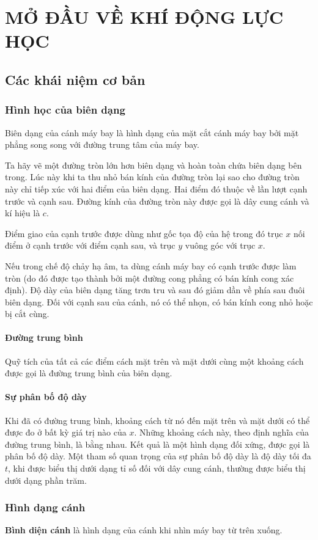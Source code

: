 \documentclass[KHI_DONG_HOC.tex]{subfiles}
\begin{document}
\chapter{MỞ ĐẦU VỀ KHÍ ĐỘNG LỰC HỌC}

\section{Các khái niệm cơ bản}
\subsection{Hình học của biên dạng}
Biên dạng của cánh máy bay là hình dạng của mặt cắt cánh máy bay bởi mặt phẳng song song với đường trung tâm của máy bay.

Ta hãy vẽ một đường tròn lớn hơn biên dạng và hoàn toàn chứa biên dạng bên trong. Lúc này khi ta thu nhỏ bán kính của đường tròn lại sao cho đường tròn này chỉ tiếp xúc với hai điểm của biên dạng. Hai điểm đó thuộc về lần lượt cạnh trước và cạnh sau. Đường kính của đường tròn này được gọi là dây cung cánh và kí hiệu là $c$.

Điểm giao của cạnh trước được dùng như gốc tọa độ của hệ trong đó trục $x$ nối điểm ở cạnh trước với điểm cạnh sau, và trục $y$ vuông góc với trục $x$.

Nếu trong chế độ chảy hạ âm, ta dùng cánh máy bay có cạnh trước được làm tròn (do đó được tạo thành bởi một đường cong phẳng có bán kính cong xác định). Độ dày của biên dạng tăng trơn tru và sau đó giảm dần về phía sau đuôi biên dạng. Đối với cạnh sau của cánh, nó có thể nhọn, có bán kính cong nhỏ hoặc bị cắt cùng.
\subsubsection{Đường trung bình}
Quỹ tích của tất cả các điểm cách mặt trên và mặt dưới cùng một khoảng cách được gọi là đường trung bình của biên dạng.
\subsubsection{Sự phân bố độ dày}
Khi đã có đường trung bình, khoảng cách từ nó đến mặt trên và mặt dưới có thể được đo ở bất kỳ giá trị nào của $x$. Những khoảng cách này, theo định nghĩa của đường trung bình, là bằng nhau. Kết quả là một hình dạng đối xứng, được gọi là phân bố độ dày. Một tham số quan trọng của sự phân bố độ dày là độ dày tối đa $t$, khi được biểu thị dưới dạng tỉ số đối với dây cung cánh, thường được biểu thị dưới dạng phần trăm.
\subsection{Hình dạng cánh}
\textbf{Bình diện cánh} là hình dạng của cánh khi nhìn máy bay từ trên xuống.
\end{document}
